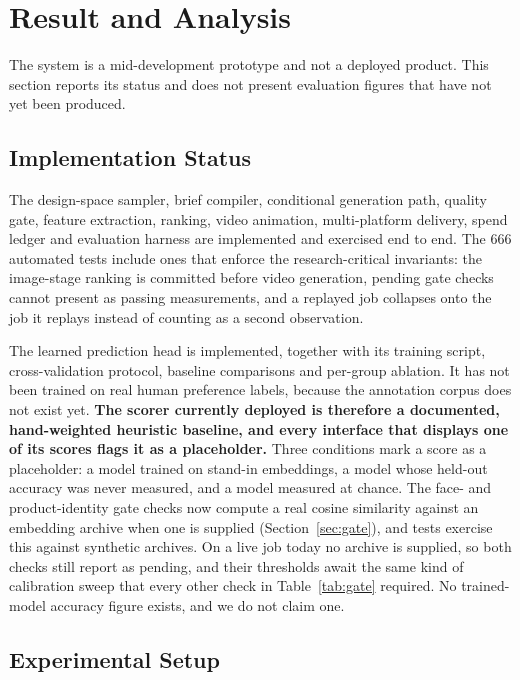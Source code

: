 \documentclass[conference]{IEEEtran}
\begin{document}
\section{Result and Analysis}
\label{sec:results}

The system is a mid-development prototype and not a deployed product. This section
reports its status and does not present evaluation figures that have not yet been
produced.

\subsection{Implementation Status}
\label{sec:implstatus}

The design-space sampler, brief compiler, conditional generation path, quality gate,
feature extraction, ranking, video animation, multi-platform delivery, spend ledger
and evaluation harness are implemented and exercised end to end. The 666 automated
tests include ones that enforce the research-critical invariants: the image-stage
ranking is committed before video generation, pending gate checks cannot present as
passing measurements, and a replayed job collapses onto the job it replays instead
of counting as a second observation.

The learned prediction head is implemented, together with its training script,
cross-validation protocol, baseline comparisons and per-group ablation. It has not
been trained on real human preference labels, because the annotation corpus does not
exist yet. \textbf{The scorer currently deployed is therefore a documented,
hand-weighted heuristic baseline, and every interface that displays one of its
scores flags it as a placeholder.} Three conditions mark a score as a placeholder: a
model trained on stand-in embeddings, a model whose held-out accuracy was never
measured, and a model measured at chance. The face- and product-identity gate checks
now compute a real cosine similarity against an embedding archive when one is
supplied (Section~\ref{sec:gate}), and tests exercise this against synthetic
archives. On a live job today no archive is supplied, so both checks still report as
pending, and their thresholds await the same kind of calibration sweep that every
other check in Table~\ref{tab:gate} required. No trained-model accuracy figure
exists, and we do not claim one.

\subsection{Experimental Setup}
\label{sec:setup}
\end{document}
